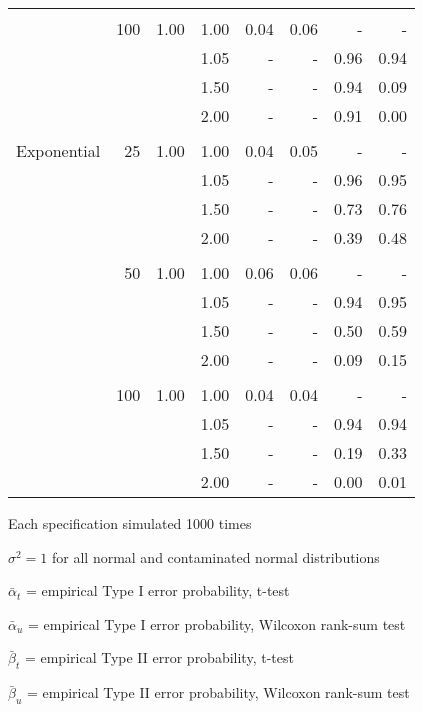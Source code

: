 \documentclass{report}
\begin{document}
\begin{table}[h!]
\begin{threeparttable}
\begin{tabular}{|l r r r r r r r|}
			& & & & & & & \\
			& 100 & 1.00 & 1.00 & 0.04 & 0.06 & - & - \\ 
			&  & & 1.05 & - & - & 0.96 & 0.94 \\ 
			&  & & 1.50 & - & - & 0.94 & 0.09 \\ 
			&  & & 2.00 & - & - & 0.91 & 0.00 \\ 
			& & & & & & & \\
			Exponential &  25 & 1.00 & 1.00 & 0.04 & 0.05 & - & - \\ 
			&   & & 1.05 & - & - & 0.96 & 0.95 \\ 
			&   & & 1.50 & - & - & 0.73 & 0.76 \\ 
			&   & & 2.00 & - & - & 0.39 & 0.48 \\ 
			& & & & & & & \\
			&  50 & 1.00 & 1.00 & 0.06 & 0.06 & - & - \\ 
			&   & & 1.05 & - & - & 0.94 & 0.95 \\ 
			&   & & 1.50 & - & - & 0.50 & 0.59 \\ 
			&   & & 2.00 & - & - & 0.09 & 0.15 \\ 
			& & & & & & & \\
			& 100 & 1.00 & 1.00 & 0.04 & 0.04 & - & - \\ 
			&  & & 1.05 & - & - & 0.94 & 0.94 \\ 
			&  & & 1.50 & - & - & 0.19 & 0.33 \\ 
			&  & & 2.00 & - & - & 0.00 & 0.01 \\ 

			\hline
		\end{tabular}
		\begin{tablenotes}
		\item Each specification simulated 1000 times
		\item $\sigma^2 = 1$ for all normal and contaminated normal
			distributions
		\item $\bar{\alpha}_t$ = empirical Type I error probability, t-test
		\item $\bar{\alpha}_u$ = empirical Type I error probability,
			Wilcoxon rank-sum test
		\item $\bar{\beta}_t$ = empirical Type II error probability, t-test
		\item $\bar{\beta}_u$ = empirical Type II error probability, Wilcoxon rank-sum test
		\end{tablenotes}
	\end{threeparttable}
\end{table}
\end{document}
